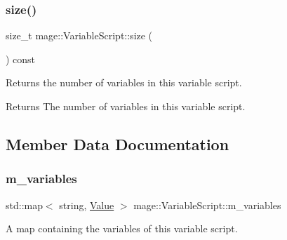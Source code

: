\subsubsection{\texorpdfstring{size()}{size()}}
{\footnotesize\ttfamily size\+\_\+t mage\+::\+Variable\+Script\+::size (\begin{DoxyParamCaption}{ }\end{DoxyParamCaption}) const\hspace{0.3cm}{\ttfamily [noexcept]}}

Returns the number of variables in this variable script.

\begin{DoxyReturn}{Returns}
The number of variables in this variable script. 
\end{DoxyReturn}


\subsection{Member Data Documentation}
\hypertarget{classmage_1_1_variable_script_aed925cedf17c486fad876764e53d9e04}{}\label{classmage_1_1_variable_script_aed925cedf17c486fad876764e53d9e04} 
\subsubsection{\texorpdfstring{m\+\_\+variables}{m\_variables}}
{\footnotesize\ttfamily std\+::map$<$ string, \hyperlink{namespacemage_aa1fe0628487e0706e44efdc62dbdb3a2}{Value} $>$ mage\+::\+Variable\+Script\+::m\+\_\+variables\hspace{0.3cm}{\ttfamily [private]}}

A map containing the variables of this variable script. 
